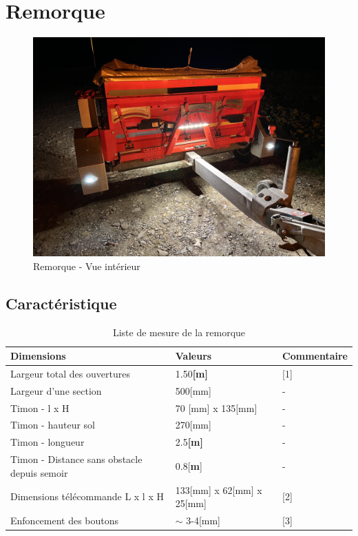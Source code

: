 \section{Remorque}
\begin{figure}[H]
    \centering
    \includegraphics[width=12cm]{assets/figures/remorque.jpeg}
    \caption{Remorque - Vue intérieur}
\end{figure}
\subsection{Caractéristique}
\begin{table}[H]
    \begin{center}
        \caption{Liste de mesure de la remorque}
        \begin{tabular}{|l|l|l|}
            Dimensions                                   & Valeurs                   & Commentaire \\ \hline
            Largeur total des ouvertures                 & 1.50\textbf{[m]}          & [1]         \\
            Largeur d'une section                        & 500[mm]                   & -           \\
            Timon - l x H                                & 70 [mm] x 135[mm]         & -           \\
            Timon - hauteur sol                          & 270[mm]                   & -           \\
            Timon - longueur                             & 2.5\textbf{[m]}           & -           \\
            Timon - Distance sans obstacle depuis semoir & 0.8[\textbf{m}]           & -           \\
            Dimensions télécommande L x l x H            & 133[mm] x 62[mm] x 25[mm] & [2]         \\
            Enfoncement des boutons                      & $\sim$ 3-4[mm]            & [3]         \\
        \end{tabular}
    \end{center}
\end{table}

